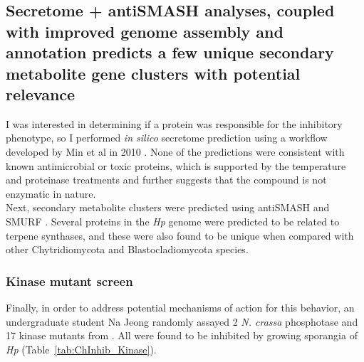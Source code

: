 \subsection*{Secretome + antiSMASH analyses, coupled with improved genome assembly and annotation predicts a few unique secondary metabolite gene clusters with potential relevance}
I was interested in determining if a protein was responsible for the inhibitory phenotype, so I performed \textit{in silico} secretome prediction using a workflow developed by Min et al in 2010 \nocite{Min2010}. None of the predictions were consistent with known antimicrobial or toxic proteins, which is supported by the temperature and proteinase treatments and further suggests that the compound is not enzymatic in nature.\\
\indent Next, secondary metabolite clusters were predicted using antiSMASH \cite{Blin2013} and SMURF \cite{Khaldi2010}. Several proteins in the \textit{Hp} genome were predicted to be related to terpene synthases, and these were also found to be unique when compared with other Chytridiomycota and Blastocladiomycota species.\\
\subsubsection*{Kinase mutant screen}
Finally, in order to address potential mechanisms of action for this behavior, an undergraduate student Na Jeong randomly assayed 2 \textit{N. crassa} phosphotase and 17 kinase mutants from \cite{Park2011}. All were found to be inhibited by growing sporangia of \textit{Hp} (Table~\ref{tab:ChInhib_Kinase}).\\
